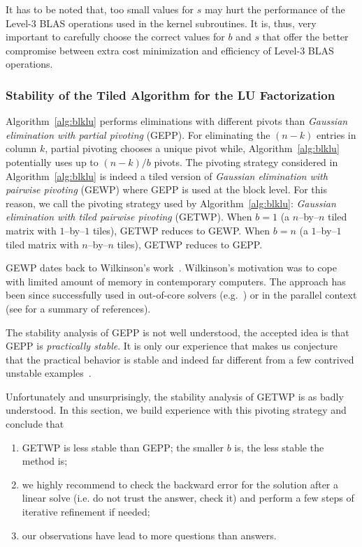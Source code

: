 \documentclass{article}
\begin{document}
It has to be noted that, too small values for $s$ may hurt the
performance of the Level-3 BLAS operations used in the kernel
subroutines. It is, thus, very important to carefully choose the
correct values for $b$ and $s$ that offer the better compromise
between extra cost minimization and efficiency of Level-3 BLAS
operations.



\subsubsection{Stability of the Tiled Algorithm for the LU Factorization}
\label{sec:stability}

Algorithm~\ref{alg:blklu} performs eliminations with different pivots than \textit{Gaussian elimination with partial pivoting} (GEPP).
For eliminating the $(n-k)$ entries in column $k$, partial pivoting chooses a unique pivot while,
Algorithm~\ref{alg:blklu} potentially uses up to $(n-k)/b$ pivots. 
The pivoting strategy considered in Algorithm~\ref{alg:blklu} is indeed a tiled version of
\textit{Gaussian elimination with pairwise pivoting} (GEWP)
where GEPP is used at the block level. For this reason,
we call the pivoting strategy used by Algorithm~\ref{alg:blklu}: \textit{Gaussian elimination with tiled pairwise pivoting} (GETWP).
When $b=1$ (a $n$--by--$n$ tiled matrix with $1$--by--$1$ tiles), GETWP reduces to GEWP.
When $b=n$ (a $1$--by--$1$ tiled matrix with $n$--by--$n$ tiles), GETWP reduces to GEPP.

GEWP dates back to Wilkinson's work~\cite{wilk:65}.
Wilkinson's motivation was to cope with limited amount of memory in contemporary computers.
The
approach has been since successfully used in 
out-of-core solvers (e.g.~\cite{DBLP:conf/para/JoffrainQG04,vdgooclu,reid:71,yip_ooc}) or in
the parallel context (see \cite[\S4.2.2]{gaps:90} for a summary of references).

The stability analysis of GEPP is not
well understood, the accepted idea is that GEPP is \textit{practically stable}. It is only our experience that
makes us conjecture that the practical behavior is stable and indeed far different from
a few contrived unstable examples~\cite{hihi:89,trsc:90}.

Unfortunately and unsurprisingly, the stability analysis of GETWP
is as badly understood. In this
section, we build experience with this pivoting strategy and conclude that
\begin{enumerate}
\item GETWP is less stable than GEPP; the smaller $b$ is, the less stable the method is;
\item we highly recommend to check the backward error for the solution after
a linear solve (i.e. do not trust the answer, check it) and perform a
few steps of iterative refinement if needed;
\item our observations have lead to more questions than answers.
\end{enumerate}
\end{document}
